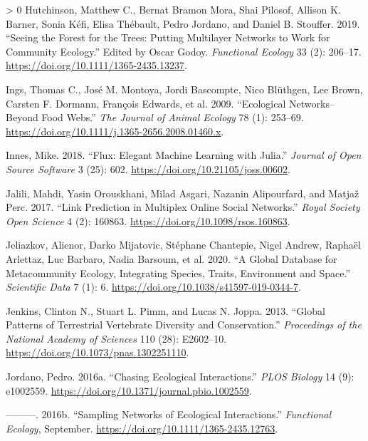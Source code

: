 \documentclass[10pt,oneside]{article}
\newlength{\cslhangindent}
\newenvironment{CSLReferences}[3] %
 {%
  \setlength{\parindent}{0pt}
  \ifodd #1 \everypar{\setlength{\hangindent}{\cslhangindent}}\ignorespaces\fi
  \ifnum #2 > 0
  \setlength{\parskip}{#2\baselineskip}
  \fi
 }%
 {}
\begin{document}
\begin{CSLReferences}{1}{0}
\leavevmode\hypertarget{ref-Hutchinson2019SeeFor}{}%
Hutchinson, Matthew C., Bernat Bramon Mora, Shai Pilosof, Allison K.
Barner, Sonia Kéfi, Elisa Thébault, Pedro Jordano, and Daniel B.
Stouffer. 2019. {``Seeing the Forest for the Trees: Putting Multilayer
Networks to Work for Community Ecology.''} Edited by Oscar Godoy.
\emph{Functional Ecology} 33 (2): 206--17.
\url{https://doi.org/10.1111/1365-2435.13237}.

\leavevmode\hypertarget{ref-Ings2009EcoNet}{}%
Ings, Thomas C., José M. Montoya, Jordi Bascompte, Nico Blüthgen, Lee
Brown, Carsten F. Dormann, François Edwards, et al. 2009. {``Ecological
Networks--Beyond Food Webs.''} \emph{The Journal of Animal Ecology} 78
(1): 253--69. \url{https://doi.org/10.1111/j.1365-2656.2008.01460.x}.

\leavevmode\hypertarget{ref-Innes2018FluEle}{}%
Innes, Mike. 2018. {``Flux: Elegant Machine Learning with Julia.''}
\emph{Journal of Open Source Software} 3 (25): 602.
\url{https://doi.org/10.21105/joss.00602}.

\leavevmode\hypertarget{ref-Jalili2017LinPre}{}%
Jalili, Mahdi, Yasin Orouskhani, Milad Asgari, Nazanin Alipourfard, and
Matjaž Perc. 2017. {``Link Prediction in Multiplex Online Social
Networks.''} \emph{Royal Society Open Science} 4 (2): 160863.
\url{https://doi.org/10.1098/rsos.160863}.

\leavevmode\hypertarget{ref-Jeliazkov2020GloDat}{}%
Jeliazkov, Alienor, Darko Mijatovic, Stéphane Chantepie, Nigel Andrew,
Raphaël Arlettaz, Luc Barbaro, Nadia Barsoum, et al. 2020. {``A Global
Database for Metacommunity Ecology, Integrating Species, Traits,
Environment and Space.''} \emph{Scientific Data} 7 (1): 6.
\url{https://doi.org/10.1038/s41597-019-0344-7}.

\leavevmode\hypertarget{ref-Jenkins2013GloPat}{}%
Jenkins, Clinton N., Stuart L. Pimm, and Lucas N. Joppa. 2013. {``Global
Patterns of Terrestrial Vertebrate Diversity and Conservation.''}
\emph{Proceedings of the National Academy of Sciences} 110 (28):
E2602--10. \url{https://doi.org/10.1073/pnas.1302251110}.

\leavevmode\hypertarget{ref-Jordano2016ChaEco}{}%
Jordano, Pedro. 2016a. {``Chasing Ecological Interactions.''} \emph{PLOS
Biology} 14 (9): e1002559.
\url{https://doi.org/10.1371/journal.pbio.1002559}.

\leavevmode\hypertarget{ref-Jordano2016SamNet}{}%
---------. 2016b. {``Sampling Networks of Ecological Interactions.''}
\emph{Functional Ecology}, September.
\url{https://doi.org/10.1111/1365-2435.12763}.


\end{CSLReferences}
\end{document}

